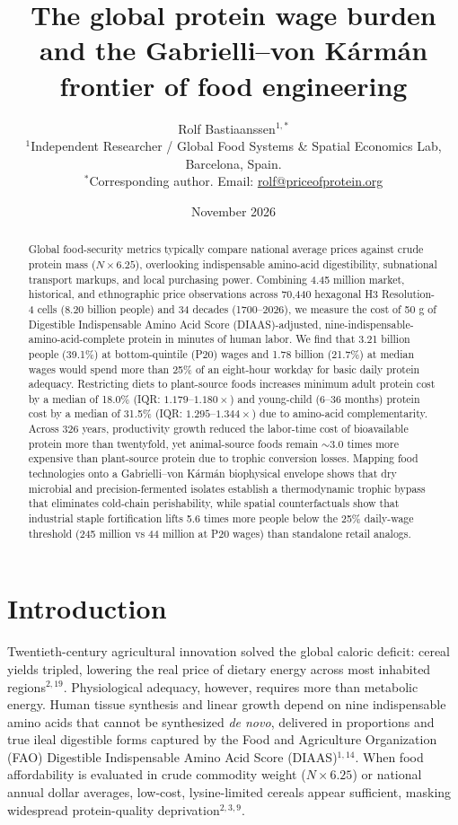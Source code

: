 \documentclass[11pt,a4paper]{article}
\title{\textbf{The global protein wage burden and the Gabrielli--von K\'arm\'an frontier of food engineering}}
\author{Rolf Bastiaanssen$^{1,*}$\\\small $^{1}$Independent Researcher / Global Food Systems \& Spatial Economics Lab, Barcelona, Spain.\\\small $^*$Corresponding author. Email: \href{mailto:rolf@priceofprotein.org}{rolf@priceofprotein.org}}
\date{November 2026}
\begin{document}
\maketitle
\begin{abstract}
Global food-security metrics typically compare national average prices against crude protein mass ($N \times 6.25$), overlooking indispensable amino-acid digestibility, subnational transport markups, and local purchasing power. Combining 4.45 million market, historical, and ethnographic price observations across 70,440 hexagonal H3 Resolution-4 cells (8.20 billion people) and 34 decades (1700--2026), we measure the cost of 50 g of Digestible Indispensable Amino Acid Score (DIAAS)-adjusted, nine-indispensable-amino-acid-complete protein in minutes of human labor. We find that 3.21 billion people (39.1\%) at bottom-quintile (P20) wages and 1.78 billion (21.7\%) at median wages would spend more than 25\% of an eight-hour workday for basic daily protein adequacy. Restricting diets to plant-source foods increases minimum adult protein cost by a median of 18.0\% (IQR: $1.179\text{--}1.180\times$) and young-child (6--36 months) protein cost by a median of 31.5\% (IQR: $1.295\text{--}1.344\times$) due to amino-acid complementarity. Across 326 years, productivity growth reduced the labor-time cost of bioavailable protein more than twentyfold, yet animal-source foods remain $\sim 3.0$ times more expensive than plant-source protein due to trophic conversion losses. Mapping food technologies onto a Gabrielli--von K\'arm\'an biophysical envelope shows that dry microbial and precision-fermented isolates establish a thermodynamic trophic bypass that eliminates cold-chain perishability, while spatial counterfactuals show that industrial staple fortification lifts 5.6 times more people below the 25\% daily-wage threshold (245 million vs 44 million at P20 wages) than standalone retail analogs.
\end{abstract}

\section*{Introduction}
Twentieth-century agricultural innovation solved the global caloric deficit: cereal yields tripled, lowering the real price of dietary energy across most inhabited regions$^{2,19}$. Physiological adequacy, however, requires more than metabolic energy. Human tissue synthesis and linear growth depend on nine indispensable amino acids that cannot be synthesized \emph{de novo}, delivered in proportions and true ileal digestible forms captured by the Food and Agriculture Organization (FAO) Digestible Indispensable Amino Acid Score (DIAAS)$^{1,14}$. When food affordability is evaluated in crude commodity weight ($N \times 6.25$) or national annual dollar averages, low-cost, lysine-limited cereals appear sufficient, masking widespread protein-quality deprivation$^{2,3,9}$.
\end{document}
